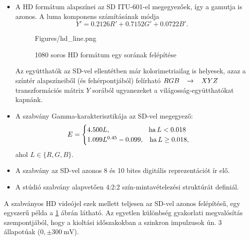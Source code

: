 \begin{itemize}
A progresszív HD formátumok nagy adatsebesség-igénye miatt az ITU-709-et néhány évvel később kibővítették egy alacsonyabb felbontású formátummal, ez 720 aktív sort és 1280 aktív pixelt alkalmaz, és kizárólag progresszív letapogatással definiálták \footnote{Az 1080p bevezetése során az egyik kitűzött cél a legalább duplázott sorszám volt.
A 720p az SD és HD között félúton: másfélszeres sort alkalmaz így a sorszáma $\frac{3}{2} \cdot 480 = 720$-ból adódik, míg az oszlopszám a 16:9 képarányból, négyzetes pixelek mellett}.
Jelölése: \textbf{720p}.
A két HD formátumra egy-egy példa a \ref{Fig:HD_formats} ábrán látható.
\item A HD formátum alapszínei az SD ITU-601-el megegyezőek, így a gamutja is azonos.
A luma komponens számításának módja 
\begin{equation}
Y' = 0.2126 R' + 0.7152 G' + 0.0722B'.
\end{equation}
\begin{figure}[]
	\centering
	\begin{overpic}[width = 1\columnwidth ]{Figures/hd_line.png}
	\end{overpic} 
	\caption{1080 soros HD formátum egy sorának felépítése}
	\label{Fig:hd_line}
\end{figure}
Az együtthatók az SD-vel ellentétben már kolorimetriailag is helyesek, azaz a színtér alapszíneiből (és fehérpontjából) felírható $RGB \hspace{3mm} \rightarrow \hspace{3mm} XYZ$ transzformációs mátrix $Y$ sorából ugyanezeket a világosság-együtthatókat kapnánk.
\item A szabvány Gamma-karakterisztikája az SD-vel megegyező:
\begin{equation}
E = 
\begin{cases}
4.500 L, \hspace{20mm} \mathrm{ha}\, L < 0.018 \\
1.099 L^{0.45} - 0.099, \hspace{3mm} \mathrm{ha}\, L \geq 0.018,
\end{cases}
\end{equation}
ahol $L \in \{ R, G, B \}$.
\item A szabvány az SD-vel azonos 8 és 10 bites digitális reprezentációt ír elő.
\item A stúdió szabvány alapvetően 4:2:2 szín-mintavételezési struktúrát definiál.
\end{itemize}
A szabványos HD videójel ezek mellett teljesen az SD-vel azonos felépítésű, egy egyszerű példa a \ref{Fig:hd_line} ábrán látható.
Az egyetlen különbség gyakorlati megvalósítás szempontjából, hogy a kioltási időszakokban a szinkron impulzusok ún. 3 állapotúak ($0, \pm300~\mathrm{mV}$).


